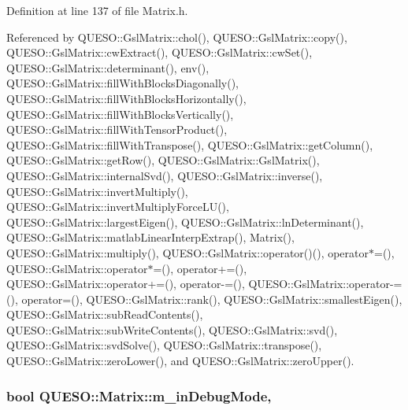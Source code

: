 Definition at line 137 of file Matrix.\-h.



Referenced by Q\-U\-E\-S\-O\-::\-Gsl\-Matrix\-::chol(), Q\-U\-E\-S\-O\-::\-Gsl\-Matrix\-::copy(), Q\-U\-E\-S\-O\-::\-Gsl\-Matrix\-::cw\-Extract(), Q\-U\-E\-S\-O\-::\-Gsl\-Matrix\-::cw\-Set(), Q\-U\-E\-S\-O\-::\-Gsl\-Matrix\-::determinant(), env(), Q\-U\-E\-S\-O\-::\-Gsl\-Matrix\-::fill\-With\-Blocks\-Diagonally(), Q\-U\-E\-S\-O\-::\-Gsl\-Matrix\-::fill\-With\-Blocks\-Horizontally(), Q\-U\-E\-S\-O\-::\-Gsl\-Matrix\-::fill\-With\-Blocks\-Vertically(), Q\-U\-E\-S\-O\-::\-Gsl\-Matrix\-::fill\-With\-Tensor\-Product(), Q\-U\-E\-S\-O\-::\-Gsl\-Matrix\-::fill\-With\-Transpose(), Q\-U\-E\-S\-O\-::\-Gsl\-Matrix\-::get\-Column(), Q\-U\-E\-S\-O\-::\-Gsl\-Matrix\-::get\-Row(), Q\-U\-E\-S\-O\-::\-Gsl\-Matrix\-::\-Gsl\-Matrix(), Q\-U\-E\-S\-O\-::\-Gsl\-Matrix\-::internal\-Svd(), Q\-U\-E\-S\-O\-::\-Gsl\-Matrix\-::inverse(), Q\-U\-E\-S\-O\-::\-Gsl\-Matrix\-::invert\-Multiply(), Q\-U\-E\-S\-O\-::\-Gsl\-Matrix\-::invert\-Multiply\-Force\-L\-U(), Q\-U\-E\-S\-O\-::\-Gsl\-Matrix\-::largest\-Eigen(), Q\-U\-E\-S\-O\-::\-Gsl\-Matrix\-::ln\-Determinant(), Q\-U\-E\-S\-O\-::\-Gsl\-Matrix\-::matlab\-Linear\-Interp\-Extrap(), Matrix(), Q\-U\-E\-S\-O\-::\-Gsl\-Matrix\-::multiply(), Q\-U\-E\-S\-O\-::\-Gsl\-Matrix\-::operator()(), operator$\ast$=(), Q\-U\-E\-S\-O\-::\-Gsl\-Matrix\-::operator$\ast$=(), operator+=(), Q\-U\-E\-S\-O\-::\-Gsl\-Matrix\-::operator+=(), operator-\/=(), Q\-U\-E\-S\-O\-::\-Gsl\-Matrix\-::operator-\/=(), operator=(), Q\-U\-E\-S\-O\-::\-Gsl\-Matrix\-::rank(), Q\-U\-E\-S\-O\-::\-Gsl\-Matrix\-::smallest\-Eigen(), Q\-U\-E\-S\-O\-::\-Gsl\-Matrix\-::sub\-Read\-Contents(), Q\-U\-E\-S\-O\-::\-Gsl\-Matrix\-::sub\-Write\-Contents(), Q\-U\-E\-S\-O\-::\-Gsl\-Matrix\-::svd(), Q\-U\-E\-S\-O\-::\-Gsl\-Matrix\-::svd\-Solve(), Q\-U\-E\-S\-O\-::\-Gsl\-Matrix\-::transpose(), Q\-U\-E\-S\-O\-::\-Gsl\-Matrix\-::zero\-Lower(), and Q\-U\-E\-S\-O\-::\-Gsl\-Matrix\-::zero\-Upper().

\hypertarget{class_q_u_e_s_o_1_1_matrix_a3384d3fc1a1058fce9191b0d74653911}{
\subsubsection[{m\-\_\-in\-Debug\-Mode}]{\setlength{\rightskip}{0pt plus 5cm}bool Q\-U\-E\-S\-O\-::\-Matrix\-::m\-\_\-in\-Debug\-Mode\hspace{0.3cm}{\ttfamily [mutable]}, {\ttfamily [protected]}}}\label{class_q_u_e_s_o_1_1_matrix_a3384d3fc1a1058fce9191b0d74653911}


